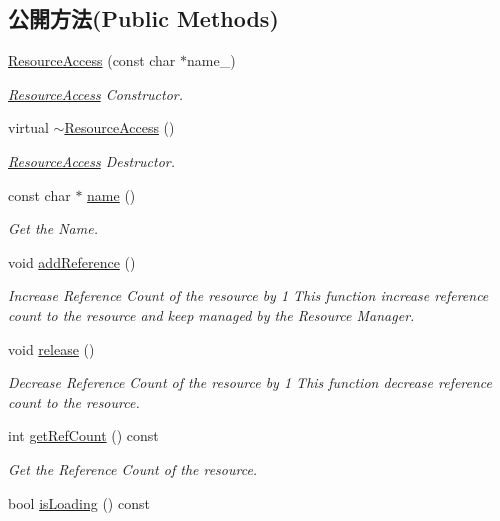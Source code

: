 \subsection*{公開方法(Public Methods)}
\begin{DoxyCompactItemize}
\item 
\hyperlink{class_magnum_1_1_resource_access_a4322947bdd4f7fb491daa02ac9a8c7d9}{Resource\+Access} (const char $\ast$name\+\_\+)
\begin{DoxyCompactList}\small\item\em \hyperlink{class_magnum_1_1_resource_access}{Resource\+Access} Constructor. \end{DoxyCompactList}\item 
virtual \hyperlink{class_magnum_1_1_resource_access_a443279db5552ee397553e556807bd637}{$\sim$\+Resource\+Access} ()
\begin{DoxyCompactList}\small\item\em \hyperlink{class_magnum_1_1_resource_access}{Resource\+Access} Destructor. \end{DoxyCompactList}\item 
const char $\ast$ \hyperlink{class_magnum_1_1_resource_access_aacebfe47ff62d9a3b23db0ad4c9c2767}{name} ()
\begin{DoxyCompactList}\small\item\em Get the Name. \end{DoxyCompactList}\item 
void \hyperlink{class_magnum_1_1_resource_access_a6da5b8b50b4a52190a0215eedaa1d0e6}{add\+Reference} ()\hypertarget{class_magnum_1_1_resource_access_a6da5b8b50b4a52190a0215eedaa1d0e6}{}\label{class_magnum_1_1_resource_access_a6da5b8b50b4a52190a0215eedaa1d0e6}

\begin{DoxyCompactList}\small\item\em Increase Reference Count of the resource by 1 This function increase reference count to the resource and keep managed by the Resource Manager. \end{DoxyCompactList}\item 
void \hyperlink{class_magnum_1_1_resource_access_a5aeaaeb81a37dd6ceac1cc7251a480f5}{release} ()
\begin{DoxyCompactList}\small\item\em Decrease Reference Count of the resource by 1 This function decrease reference count to the resource. \end{DoxyCompactList}\item 
int \hyperlink{class_magnum_1_1_resource_access_a64e4a911f49d166c02b9cd1f6f8c4e90}{get\+Ref\+Count} () const 
\begin{DoxyCompactList}\small\item\em Get the Reference Count of the resource. \end{DoxyCompactList}\item 
bool \hyperlink{class_magnum_1_1_resource_access_aee67422c4295313158b2682cbc8a2d53}{is\+Loading} () const \hypertarget{class_magnum_1_1_resource_access_aee67422c4295313158b2682cbc8a2d53}{}\label{class_magnum_1_1_resource_access_aee67422c4295313158b2682cbc8a2d53}


\end{DoxyCompactItemize}

